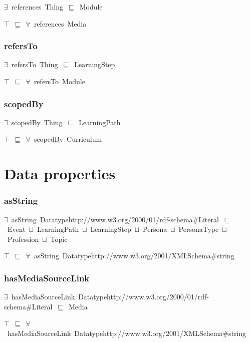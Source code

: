 \documentclass{article}
\begin{document}
\ensuremath{\exists}~references~Thing~\ensuremath{\sqsubseteq}~Module

\ensuremath{\top}~\ensuremath{\sqsubseteq}~\ensuremath{\forall}~references~Media

\subsubsection*{refersTo}

\ensuremath{\exists}~refersTo~Thing~\ensuremath{\sqsubseteq}~LearningStep

\ensuremath{\top}~\ensuremath{\sqsubseteq}~\ensuremath{\forall}~refersTo~Module

\subsubsection*{scopedBy}

\ensuremath{\exists}~scopedBy~Thing~\ensuremath{\sqsubseteq}~LearningPath

\ensuremath{\top}~\ensuremath{\sqsubseteq}~\ensuremath{\forall}~scopedBy~Curriculum

\section*{Data properties}\subsubsection*{asString}

\ensuremath{\exists}~asString~Datatypehttp://www.w3.org/2000/01/rdf-schema#Literal~\ensuremath{\sqsubseteq}~Event~\ensuremath{\sqcup}~LearningPath~\ensuremath{\sqcup}~LearningStep~\ensuremath{\sqcup}~Persona~\ensuremath{\sqcup}~PersonaType~\ensuremath{\sqcup}~Profession~\ensuremath{\sqcup}~Topic

\ensuremath{\top}~\ensuremath{\sqsubseteq}~\ensuremath{\forall}~asString~Datatypehttp://www.w3.org/2001/XMLSchema#string

\subsubsection*{hasMediaSourceLink}

\ensuremath{\exists}~hasMediaSourceLink~Datatypehttp://www.w3.org/2000/01/rdf-schema#Literal~\ensuremath{\sqsubseteq}~Media

\ensuremath{\top}~\ensuremath{\sqsubseteq}~\ensuremath{\forall}~hasMediaSourceLink~Datatypehttp://www.w3.org/2001/XMLSchema#string
\end{document}
